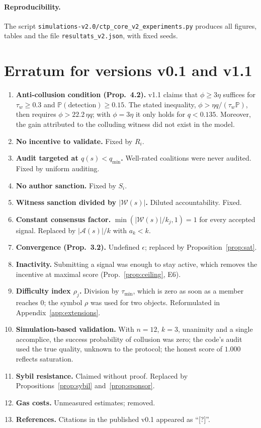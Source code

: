 \documentclass[11pt,a4paper]{article}
\theoremstyle{plain}
\theoremstyle{definition}
\theoremstyle{remark}
\newcommand{\1}{\mathbf{1}}
\newcommand{\Prob}{\mathbb{P}}
\begin{document}
\paragraph{Reproducibility.} The script
\texttt{simulations-v2.0/ctp\_core\_v2\_experiments.py}
produces all figures, tables and the file \texttt{resultats\_v2.json}, with
fixed seeds.

\appendix
\section{Erratum for versions v0.1 and v1.1}
\label{app:erratum}

\begin{enumerate}
  \item \textbf{Anti-collusion condition (Prop.~4.2).} v1.1 claims that
    $\phi\ge3\eta$ suffices for $\tau_w\ge0.3$ and
    $\Prob(\text{detection})\ge0.15$. The stated inequality,
    $\phi>\eta q/(\tau_w\Prob)$, then requires $\phi>22.2\,\eta q$; with
    $\phi=3\eta$ it only holds for $q<0.135$. Moreover, the gain attributed to
    the colluding witness did not exist in the model.
  \item \textbf{No incentive to validate.} Fixed by $R_i$.
  \item \textbf{Audit targeted at $q(s)<q_{\min}$.} Well-rated coalitions were
    never audited. Fixed by uniform auditing.
  \item \textbf{No author sanction.} Fixed by $S_i$.
  \item \textbf{Witness sanction divided by $|\mathcal{W}(s)|$.} Diluted
    accountability. Fixed.
  \item \textbf{Constant consensus factor.} $\min(|\mathcal{W}(s)|/k_j,1)=1$ for
    every accepted signal. Replaced by $|\mathcal{A}(s)|/k$ with $a_k<k$.
  \item \textbf{Convergence (Prop.~3.2).} Undefined $\epsilon$; replaced by
    Proposition~\ref{prop:sat}.
  \item \textbf{Inactivity.} Submitting a signal was enough to stay active,
    which removes the incentive at maximal score (Prop.~\ref{prop:ceiling}, E6).
  \item \textbf{Difficulty index $\rho_j$.} Division by $\tau_{\min}$, which is
    zero as soon as a member reaches 0; the symbol $\rho$ was used for two
    objects. Reformulated in Appendix~\ref{app:extensions}.
  \item \textbf{Simulation-based validation.} With $n=12$, $k=3$, unanimity and
    a single accomplice, the success probability of collusion was zero; the
    code's audit used the true quality, unknown to the protocol; the honest
    score of $1.000$ reflects saturation.
  \item \textbf{Sybil resistance.} Claimed without proof. Replaced by
    Propositions~\ref{prop:sybil} and~\ref{prop:sponsor}.
  \item \textbf{Gas costs.} Unmeasured estimates; removed.
  \item \textbf{References.} Citations in the published v0.1 appeared as
    ``[?]''.
\end{enumerate}
\end{document}

